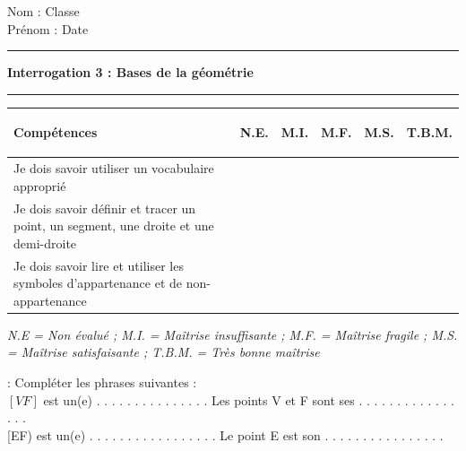 \documentclass[a4paper,11pt]{article}
\newcounter{numexo}
\newcommand{\exo}[1]{\stepcounter{numexo}\noindent{\bf Exercice~\thenumexo} : \marginpar{\hfill /#1}}
\newcommand{\titre}[5] 
{
\noindent #2 \hfill #4 \\
#3 \hfill #5

\vspace{-1.6cm}

\begin{center}\rule{6cm}{0.5mm}\end{center}
\vspace{0.2cm}
\begin{center}{\large{\textbf{#1}}}\end{center}
\begin{center}\rule{6cm}{0.5mm}\end{center}
}
\begin{document}
\pagestyle{empty}
\titre{Interrogation 3 : Bases de la géométrie}{Nom :}{Prénom :}{Classe}{Date}

\vspace*{0.5cm}
\begin{flushleft}
\begin{tabular}{|m{9.5cm}|m{1.25cm}|m{1.25cm}|m{1.25cm}|m{1.25cm}|m{1.25cm}|}
\hline 
\textbf{Compétences} & \begin{center}
\textbf{N.E.}
\end{center} & \begin{center}
\textbf{M.I.}
\end{center} & \begin{center}
\textbf{M.F.}
\end{center}  & \begin{center}
\textbf{M.S.}
\end{center} & \begin{center}
\textbf{T.B.M.}
\end{center} \\ 
\hline 
Je dois savoir utiliser un vocabulaire approprié &  &  & & &\\
\hline 
Je dois savoir définir et tracer un point, un segment, une droite et une demi-droite &  &  & & &\\
\hline
Je dois savoir lire et utiliser les symboles d'appartenance et de non-appartenance &  &  & & &\\ 
\hline

\end{tabular} 
\end{flushleft}

\textit{N.E = Non évalué ; M.I. = Maîtrise insuffisante ; M.F. = Maîtrise fragile ; M.S. = Maîtrise satisfaisante ; T.B.M. = Très bonne maîtrise}\\


\vspace*{0.5cm}


\exo{2}  Compléter les phrases suivantes :\\

$[VF]$ est un(e) . . . . . . . . . . . . . . . \hspace*{0.5cm} Les points V et F sont ses . . . . . . . . . . . . . . . .\\


[EF) est un(e) . . . . . . . . . . . . . . . . . \hspace*{0.5cm} Le point E est son . . . . . . . . . . . . . . . .\\
\end{document}
